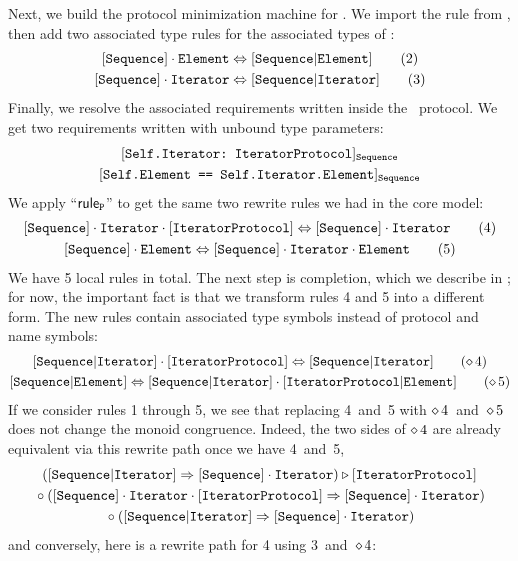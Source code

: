 \documentclass[../generics]{subfiles}
\begin{document}
\begin{example}
Next, we build the protocol minimization machine for \tSequence. We import the rule from \tIterator, then add two associated type rules for the associated types of \tSequence:
\begin{gather*}
\AssocRule{Sequence}{Element}\tag{2}\\
\AssocRule{Sequence}{Iterator}\tag{3}
\end{gather*}
Finally, we resolve the associated requirements written inside the \tSequence\ protocol. We get two requirements written with unbound type parameters:
\begin{gather*}
\AssocConfReq{Self.Iterator}{IteratorProtocol}{Sequence}\\
\SameReq{Self.Element}{Self.Iterator.Element}_\tSequence
\end{gather*}
We apply ``$\mathsf{rule}_{\texttt{P}}$'' to get the same two rewrite rules we had in the core model:
\begin{gather*}
\ConfRule{\pSequence\cdot\nIterator}{\pIterator} \tag{4} \\
\SameRule{\pSequence\cdot\nElement}{\pSequence\cdot\nIterator\cdot\nElement} \tag{5}
\end{gather*}
We have 5 local rules in total. The next step is completion, which we describe in ; for now, the important fact is that we transform rules 4 and 5 into a different form. The new rules contain associated type symbols instead of protocol and name symbols:
\begin{gather*}
\ConfRule{\assocsym{Sequence}{Iterator}}{\pIterator} \tag{$\CRule{4}$} \\
\SameRule{\assocsym{Sequence}{Element}}{\assocsym{Sequence}{Iterator}\cdot\assocsym{IteratorProtocol}{Element}} \tag{$\CRule{5}$}
\end{gather*}
If we consider rules 1 through 5, we see that replacing 4~and~5 with $\diamond\, 4$~and~$\diamond\, 5$ does not change the monoid congruence. Indeed, the two sides of $\diamond\, 4$ are already equivalent via this rewrite path once we have 4~and~5,
\begin{gather*}
([\texttt{Sequence}|\texttt{Iterator}] \Rightarrow [\texttt{Sequence}]\cdot\texttt{Iterator}) \triangleright [\texttt{IteratorProtocol}]\\
{} \circ ([\texttt{Sequence}]\cdot\texttt{Iterator}\cdot[\texttt{IteratorProtocol}] \Rightarrow [\texttt{Sequence}]\cdot\texttt{Iterator})\\
{} \circ ([\texttt{Sequence}|\texttt{Iterator}] \Rightarrow [\texttt{Sequence}]\cdot\texttt{Iterator})
\end{gather*}
and conversely, here is a rewrite path for 4 using 3~and~$\diamond\, 4$:
\begin{gather*}

\end{gather*}
\end{example}
\end{document}
